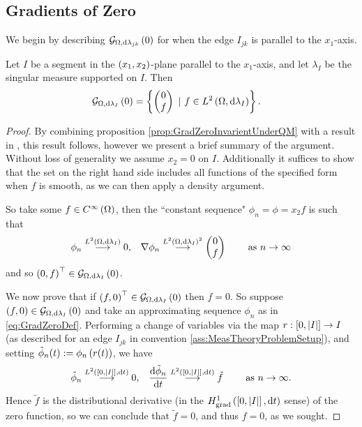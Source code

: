 \subsection{Gradients of Zero} \label{appS:muGradZero}
We begin by describing $\mathcal{G}_{ \Omega, \mathrm{d}\lambda_{jk}}\left( 0 \right)$ for when the edge $I_{jk}$ is parallel to the $x_1$-axis.
\begin{prop} \label{prop:GradZeroParallelZhikov}
	Let $I$ be a segment in the $\left( x_1,x_2 \right)$-plane parallel to the $x_1$-axis, and let $\lambda_I$ be the singular measure supported on $I$.
	Then 
	\begin{align*}
		\mathcal{G}_{ \Omega, \mathrm{d}\lambda_I}\left( 0 \right) &= 
		\left\{ 
			\begin{pmatrix} 0 \\ f	\end{pmatrix}
			\ \vert \ f\in L^{2}\left( \Omega,\mathrm{d}\lambda_I \right)
		 \right\}.
	\end{align*}
\end{prop}
\begin{proof}
	By combining proposition \ref{prop:GradZeroInvarientUnderQM} with a result in \cite{zhikov2000extension} , this result follows, however we present a brief summary of the argument.
	Without loss of generality we assume $x_2=0$ on $I$.
	Additionally it suffices to show that the set on the right hand side includes all functions of the specified form when $f$ is smooth, as we can then apply a density argument. \newline
	
	So take some $f\in C^{\infty}\left( \Omega \right)$, then the ``constant sequence" $\phi_n = \phi = x_2 f$ is such that
	\begin{align*}
		\phi_n\overset{L^{2}\left( \Omega,\mathrm{d}\lambda_I \right)}{\longrightarrow}0, 
		&\quad \nabla\phi_n\overset{L^{2}\left( \Omega,\mathrm{d}\lambda_I \right)^2}{\longrightarrow} \begin{pmatrix} 0 \\ f \end{pmatrix}
		&\quad \ \text{as} \ n \rightarrow\infty
	\end{align*}	 
	and so $\left( 0,f \right)^\top\in\mathcal{G}_{ \Omega, \mathrm{d}\lambda_I}\left( 0 \right)$. \newline
	
	We now prove that if $\left( f,0 \right)^\top\in\mathcal{G}_{ \Omega, \mathrm{d}\lambda_I}\left( 0 \right)$ then $f=0$.
	So suppose $\left( f,0 \right)\in\mathcal{G}_{ \Omega, \mathrm{d}\lambda_I}\left( 0 \right)$ and take an approximating sequence $\phi_n$ as in \eqref{eq:GradZeroDef}.
	Performing a change of variables via the map $r:\left[ 0,\left\lvert I \right\rvert \right]\rightarrow I$ (as described for an edge $I_{jk}$ in convention \ref{ass:MeasTheoryProblemSetup}), and setting $\tilde{\phi}_n(t) := \phi_n\left( r(t) \right)$, we have
	\begin{align*}
		\tilde{\phi}_n\overset{L^{2}\left( \left[ 0,\left\lvert I \right\rvert \right],\mathrm{d}t \right)}{\longrightarrow} 0, 
		&\quad \dfrac{\mathrm{d}\tilde{\phi}_n}{\mathrm{d}t}\overset{L^{2}\left( \left[ 0,\left\lvert I \right\rvert \right],\mathrm{d}t \right)}{\longrightarrow} \tilde{f}
		&\quad \ \text{as} \ n \rightarrow\infty.
	\end{align*}
	Hence $\tilde{f}$ is the distributional derivative (in the $H^1_\mathrm{grad}\left( \left[ 0,\left\lvert I \right\rvert \right], \mathrm{d}t \right)$ sense) of the zero function, so we can conclude that $\tilde{f} = 0$, and thus $f = 0$, as we sought.
\end{proof}

